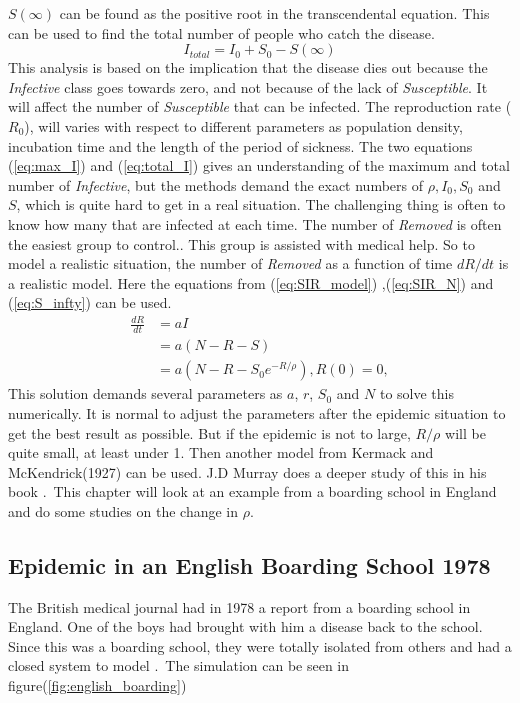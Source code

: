 \documentclass[%
twoside,                 %
final,                   %
10pt]{article}
\begin{document}
$S(\infty)$ can be found as the positive root in the transcendental equation. This can be used to find the total number of people who catch the disease.
\begin{equation} \label{eq:total_I}
I_{total} = I_0 + S_0 -S(\infty)
\end{equation}
This analysis is based on the implication that the disease dies out because the \emph{Infective} class goes towards zero, and not because of the lack of \emph{Susceptible}. It will affect the number of \emph{Susceptible} that can be infected. The reproduction rate ($R_0$), will varies with respect to different parameters as population density, incubation time and the length of the period of sickness. The two equations (\ref{eq:max_I}) and (\ref{eq:total_I}) gives an understanding of the maximum and total number of \emph{Infective}, but the methods demand the exact numbers of $\rho,I_0,S_0$ and $S$, which is quite hard to get in a real situation. The challenging thing is often to know how many that are infected at each time. The number of \emph{Removed} is often the easiest group to control.. This group is assisted with medical help. So to model a realistic situation, the number of \emph{Removed} as a function of time $dR/dt$ is a realistic model. Here the equations from (\ref{eq:SIR_model}) ,(\ref{eq:SIR_N}) and (\ref{eq:S_infty}) can be used.
\begin{equation} \label{eq:dR_normal}
	\begin{aligned} 
	\frac{dR}{dt} &= aI\\
	&= a(N-R-S)\\
	&= a(N-R-S_0e^{-R/\rho}), R(0)=0,
	\end{aligned}
\end{equation}
This solution demands several parameters as $a$, $r$, $S_0$ and $N$ to solve this numerically. It is normal to adjust the parameters after the epidemic situation to get the best result as possible. But if the epidemic is not to large, $R/\rho$ will be quite small, at least under 1. Then another model from Kermack and McKendrick(1927) can be used. J.D Murray does a deeper study of this in his book \cite[p.~324]{murray2002mathematical}.~This chapter will look at an example from a boarding school in England and do some studies on the change in $\rho$.  

\subsection{Epidemic in an English Boarding School 1978}
The British medical journal had in 1978 a report from a boarding school in England. One of the boys had brought with him a disease back to the school. Since this was a boarding school, they were totally isolated from others and had a closed system to model \cite[p.~325]{murray2002mathematical}.~The simulation can be seen in figure(\ref{fig:english_boarding})  
\end{document}
